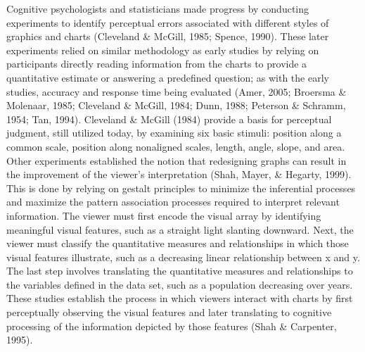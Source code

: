 \documentclass[print]{nuthesis}
\begin{document}
Cognitive psychologists and statisticians made progress by conducting experiments to identify perceptual errors associated with different styles of graphics and charts (Cleveland \& McGill, 1985; Spence, 1990).
These later experiments relied on similar methodology as early studies by relying on participants directly reading information from the charts to provide a quantitative estimate or answering a predefined question; as with the early studies, accuracy and response time being evaluated (Amer, 2005; Broersma \& Molenaar, 1985; Cleveland \& McGill, 1984; Dunn, 1988; Peterson \& Schramm, 1954; Tan, 1994). 
Cleveland \& McGill (1984) provide a basis for perceptual judgment, still utilized today, by examining six basic stimuli: position along a common scale, position along nonaligned scales, length, angle, slope, and area.
Other experiments established the notion that redesigning graphs can result in the improvement of the viewer's interpretation (Shah, Mayer, \& Hegarty, 1999).
This is done by relying on gestalt principles to minimize the inferential processes and maximize the pattern association processes required to interpret relevant information. 
The viewer must first encode the visual array by identifying meaningful visual features, such as a straight light slanting downward.
Next, the viewer must classify the quantitative measures and relationships in which those visual features illustrate, such as a decreasing linear relationship between x and y.
The last step involves translating the quantitative measures and relationships to the variables defined in the data set, such as a population decreasing over years.
These studies establish the process in which viewers interact with charts by first perceptually observing the visual features and later translating to cognitive processing of the information depicted by those features (Shah \& Carpenter, 1995).
\end{document}
